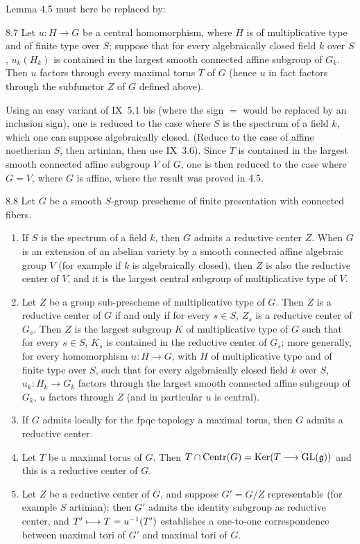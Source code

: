 Lemma 4.5 must here be replaced by:
\begin{lemma}{8.7}\label{XII.8.7}
Let $u:H\to G$ be a central homomorphism, where $H$ is of multiplicative type and of finite type over $S$; suppose that for every algebraically closed field $k$ over $S$, $u_k(H_k)$ is contained in the largest smooth connected affine subgroup of $G_k$. Then $u$ factors through every maximal torus $T$ of $G$ (hence $u$ in fact factors through the subfunctor $Z$ of $G$ defined above).
\end{lemma}
Using an easy variant of IX~5.1 bis (where the sign $=$ would be replaced by an inclusion sign), one is reduced to the case where $S$ is the spectrum of a field $k$, which one can suppose algebraically closed. (Reduce to the case of affine noetherian $S$, then artinian, then use IX~3.6). Since $T$ is contained in the largest smooth connected affine subgroup $V$ of $G$, one is then reduced to the case where $G=V$, \ie where $G$ is affine, where the result was proved in 4.5.
\begin{proposition}{8.8}\label{XII.8.8}
Let $G$ be a smooth $S$-group prescheme of finite presentation with connected fibers.
\begin{enumerate}[label=\alph*)]
\item If $S$ is the spectrum of a field $k$, then $G$ admits a reductive center $Z$. When $G$ is an extension of an abelian variety by a smooth connected affine algebraic group $V$ (for example if $k$ is algebraically closed), then $Z$ is also the reductive center of $V$, and it is the largest central subgroup of multiplicative type of $V$.
\item Let $Z$ be a group sub-prescheme of multiplicative type of $G$. Then $Z$ is a reductive center of $G$ if and only if for every $s\in S$, $Z_s$ is a reductive center of $G_s$. Then $Z$ is the largest subgroup $K$ of multiplicative type of $G$ such that for every $s\in S$, $K_s$ is contained in the reductive center of $G_s$; more generally, for every homomorphism $u:H\to G$, with $H$ of multiplicative type and of finite type over $S$, such that for every algebraically closed field $k$ over $S$, $u_k:H_k\to G_k$ factors through the largest smooth connected affine subgroup of $G_k$, $u$ factors through $Z$ (and in particular $u$ is central).
\item If $G$ admits locally for the fpqc topology a maximal torus, then $G$ admits a reductive center.
\item Let $T$ be a maximal torus of $G$. Then $T\cap\operatorname{Centr}(G)=\operatorname{Ker}(T\longrightarrow\operatorname{GL}(\mathfrak g))$ and this is a reductive center of $G$.
\item Let $Z$ be a reductive center of $G$, and suppose $G'=G/Z$ representable (for example $S$ artinian); then $G'$ admits the identity subgroup as reductive center, and $T'\longmapsto T=u^{-1}(T')$ establishes a one-to-one correspondence between maximal tori of $G'$ and maximal tori of $G$.
\end{enumerate}
\end{proposition}
